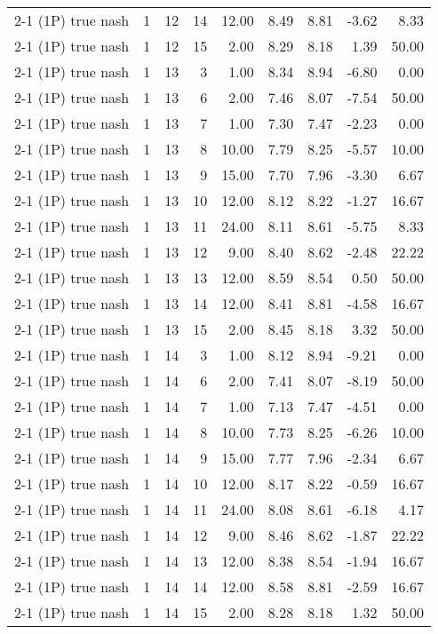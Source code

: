 \begin{tabular}{lrrrrrrrr}
2-1 (1P) true nash & 1 & 12 & 14 & 12.00 & 8.49 & 8.81 & -3.62 & 8.33 \\
2-1 (1P) true nash & 1 & 12 & 15 & 2.00 & 8.29 & 8.18 & 1.39 & 50.00 \\
2-1 (1P) true nash & 1 & 13 & 3 & 1.00 & 8.34 & 8.94 & -6.80 & 0.00 \\
2-1 (1P) true nash & 1 & 13 & 6 & 2.00 & 7.46 & 8.07 & -7.54 & 50.00 \\
2-1 (1P) true nash & 1 & 13 & 7 & 1.00 & 7.30 & 7.47 & -2.23 & 0.00 \\
2-1 (1P) true nash & 1 & 13 & 8 & 10.00 & 7.79 & 8.25 & -5.57 & 10.00 \\
2-1 (1P) true nash & 1 & 13 & 9 & 15.00 & 7.70 & 7.96 & -3.30 & 6.67 \\
2-1 (1P) true nash & 1 & 13 & 10 & 12.00 & 8.12 & 8.22 & -1.27 & 16.67 \\
2-1 (1P) true nash & 1 & 13 & 11 & 24.00 & 8.11 & 8.61 & -5.75 & 8.33 \\
2-1 (1P) true nash & 1 & 13 & 12 & 9.00 & 8.40 & 8.62 & -2.48 & 22.22 \\
2-1 (1P) true nash & 1 & 13 & 13 & 12.00 & 8.59 & 8.54 & 0.50 & 50.00 \\
2-1 (1P) true nash & 1 & 13 & 14 & 12.00 & 8.41 & 8.81 & -4.58 & 16.67 \\
2-1 (1P) true nash & 1 & 13 & 15 & 2.00 & 8.45 & 8.18 & 3.32 & 50.00 \\
2-1 (1P) true nash & 1 & 14 & 3 & 1.00 & 8.12 & 8.94 & -9.21 & 0.00 \\
2-1 (1P) true nash & 1 & 14 & 6 & 2.00 & 7.41 & 8.07 & -8.19 & 50.00 \\
2-1 (1P) true nash & 1 & 14 & 7 & 1.00 & 7.13 & 7.47 & -4.51 & 0.00 \\
2-1 (1P) true nash & 1 & 14 & 8 & 10.00 & 7.73 & 8.25 & -6.26 & 10.00 \\
2-1 (1P) true nash & 1 & 14 & 9 & 15.00 & 7.77 & 7.96 & -2.34 & 6.67 \\
2-1 (1P) true nash & 1 & 14 & 10 & 12.00 & 8.17 & 8.22 & -0.59 & 16.67 \\
2-1 (1P) true nash & 1 & 14 & 11 & 24.00 & 8.08 & 8.61 & -6.18 & 4.17 \\
2-1 (1P) true nash & 1 & 14 & 12 & 9.00 & 8.46 & 8.62 & -1.87 & 22.22 \\
2-1 (1P) true nash & 1 & 14 & 13 & 12.00 & 8.38 & 8.54 & -1.94 & 16.67 \\
2-1 (1P) true nash & 1 & 14 & 14 & 12.00 & 8.58 & 8.81 & -2.59 & 16.67 \\
2-1 (1P) true nash & 1 & 14 & 15 & 2.00 & 8.28 & 8.18 & 1.32 & 50.00 \\

\end{tabular}
